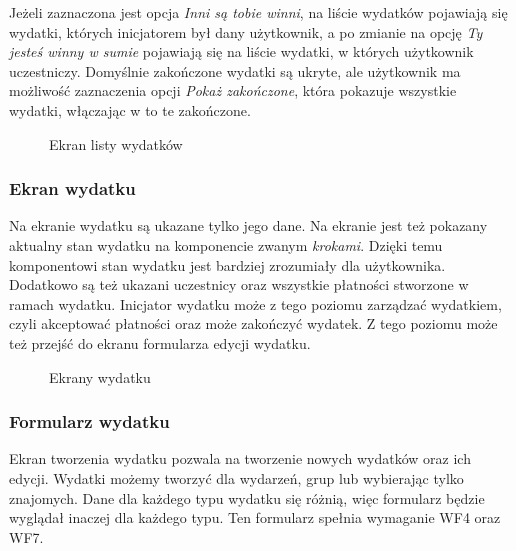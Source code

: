 Jeżeli zaznaczona jest opcja \emph{Inni są tobie winni}, na liście wydatków pojawiają się wydatki, których inicjatorem był dany użytkownik, a po zmianie na opcję \emph{Ty jesteś winny w sumie} pojawiają się na liście wydatki, w których użytkownik uczestniczy. Domyślnie zakończone wydatki są ukryte, ale użytkownik ma możliwość zaznaczenia opcji \emph{Pokaż zakończone}, która pokazuje wszystkie wydatki, włączając w to te zakończone.

\begin{figure}[h]%
    \centering
    \caption{Ekran listy wydatków}%
\end{figure}

\clearpage
\subsubsection{Ekran wydatku}
Na ekranie wydatku są ukazane tylko jego dane. Na ekranie jest też pokazany aktualny stan wydatku na komponencie zwanym \emph{krokami}. Dzięki temu komponentowi stan wydatku jest bardziej zrozumiały dla użytkownika. Dodatkowo są też ukazani uczestnicy oraz wszystkie płatności stworzone w ramach wydatku. Inicjator wydatku może z tego poziomu zarządzać wydatkiem, czyli akceptować płatności oraz może zakończyć wydatek. Z tego poziomu może też przejść do ekranu formularza edycji wydatku.

\begin{figure}[h!]%
    \centering
    \qquad
    \qquad
    \qquad
    \caption{Ekrany wydatku}%
\end{figure}

\clearpage
\subsubsection{Formularz wydatku}
Ekran tworzenia wydatku pozwala na tworzenie nowych wydatków oraz ich edycji. Wydatki możemy tworzyć dla wydarzeń, grup lub wybierając tylko znajomych. Dane dla każdego typu wydatku się różnią, więc formularz będzie wyglądał inaczej dla każdego typu. Ten formularz spełnia wymaganie WF4 oraz WF7.


